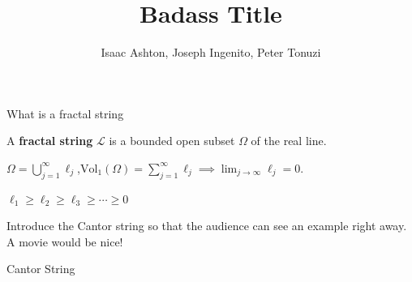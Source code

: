 \documentclass{if-beamer}
\title[]{Badass Title}
\subtitle{}
\author{Isaac Ashton, Joseph Ingenito, Peter Tonuzi}
\institute[]{The College of New Jersey}
\date{}
\begin{document}
\begin{frame}
  \titlepage
\end{frame}

\begin{frame}{What is a fractal string}

\begin{definition}
A {\bf fractal string} $\mathcal{L}$ is a bounded open subset $\Omega$ of the real line.
\end{definition}

\pause
\vspace{.2 in}

$\Omega = \displaystyle\bigcup_{j = 1}^\infty \ell_j$,\qquad $\displaystyle\text{Vol}_1\left(\Omega\right) = \sum_{j = 1}^\infty \ell_j \implies \lim_{j \to \infty} \ell_j = 0$.

\pause
\vspace{.2 in}

$\ell_1 \geq \ell_2 \geq \ell_3 \geq \cdots \geq 0$

\pause
\vspace{.2 in}

{\color{red} Introduce the Cantor string so that the audience can see an example right away. A movie would be nice!}

\end{frame}

\begin{frame}{Cantor String}
	\begin{center}
	\end{center}
\end{frame}
\end{document}
